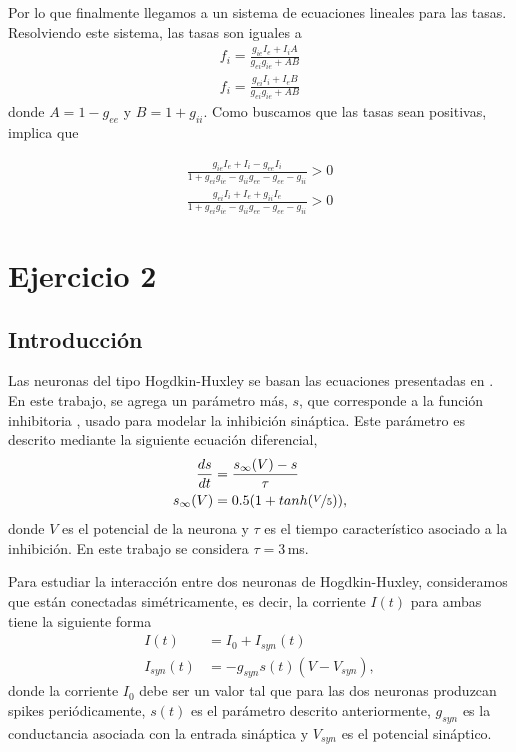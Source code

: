 Por lo que finalmente llegamos a un sistema de ecuaciones lineales para las tasas. Resolviendo este sistema, las tasas son iguales a 
\begin{align}
     f_i = \frac{g_{ie}I_e + I_iA}{g_{ei}g_{ie}+ AB}\\
     f_i = \frac{g_{ei}I_i + I_eB}{g_{ei}g_{ie}+ AB} 
\end{align}
donde $A= 1 - g_{ee}$ y $B=1+g_{ii}$. Como buscamos que las tasas sean positivas, implica que 

\begin{align}
     \frac{g_{ie}I_e + I_i -g_{ee}I_i }{1+g_{ei}g_{ie} - g_{ii}g_{ee} -g_{ee}-g_{ii}} > 0\\
     \frac{g_{ei}I_i + I_e +g_{ii}I_e }{1+g_{ei}g_{ie} - g_{ii}g_{ee} -g_{ee}-g_{ii}} > 0 
\end{align}


\section*{Ejercicio 2}

\subsection{Introducción}

Las neuronas del tipo Hogdkin-Huxley se basan las ecuaciones presentadas en \cite{HH}. En este trabajo, se agrega un parámetro más, $s$, que corresponde a la función inhibitoria \cite{syn}, usado para modelar la inhibición sináptica. Este parámetro es descrito mediante la siguiente ecuación diferencial,
\begin{align}
    \frac{ds}{dt}&= \frac{s_\infty(V) - s}{\tau}\\
    s_\infty(V)&= 0.5(1+tanh(\nicefrac{V}{5})),
\end{align}
donde $V$ es el potencial de  la neurona y $\tau$ es el tiempo característico asociado a la inhibición. En este trabajo se considera  $\tau = 3\,$ms.

Para estudiar la interacción entre dos neuronas de Hogdkin-Huxley, consideramos que están conectadas simétricamente, es decir, la corriente $I(t)$ para ambas tiene la siguiente forma
\begin{align}
    I(t)            &= I_0 + I_{syn}(t)\\
    I_{syn}(t)      &= -g_{syn}s(t)(V-V_{syn}),
\end{align}
donde la corriente $I_0$ debe ser un valor tal que para las dos neuronas produzcan spikes periódicamente, $s(t)$ es el parámetro descrito anteriormente, $g_{syn}$ es la conductancia asociada con la entrada sináptica y $V_{syn}$ es el potencial sináptico.

